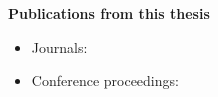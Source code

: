 \documentclass[12pt, oneside]{Thesis} %
\begin{document}

\mainmatter %

\pagestyle{fancy} %



 

 
 
 








\appendix %


%
%
%


\backmatter



 


\label{Bibliography}




\newpage
\thispagestyle{plain}
\textbf{ \Large Publications from this thesis}


\begin{itemize}
\item Journals: 


\item Conference proceedings:


\end{itemize}

\printindex
\end{document}
